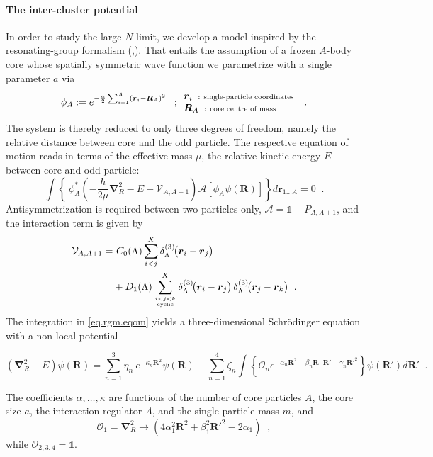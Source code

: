\documentclass[aps,nofootinbib,prl,showpacs,twocolumn,groupedaddress,superscriptaddress]
{revtex4}
\newcommand{\la}{\label}
\newcommand{\be}{\begin{equation}}
\newcommand{\ee}{\end{equation}}
\newcommand{\ve}[1]{\ensuremath{\boldsymbol{#1}}}
\newcommand{\ddrei}[1]{\delta_{\tiny \Lambda}^{(3)}\!\big(#1\big)}
\begin{document}
\paragraph{The inter-cluster potential}
In order to study the large-$N$ limit, we develop a model inspired by the resonating-group formalism
(\cite{Wheeler:1937zz},\cite{Wildermuth1977s}).
That entails the assumption of a frozen $A$-body core whose spatially symmetric wave function we
parametrize with a single parameter $a$ via
\be\label{eq.rgm.corewfkt}
\phi_A:=e^{-\frac{a}{2}\sum_{i=1}^A\left(\ve{r}_i-\ve{R}_A\right)^2}\;\;\;;
\begin{array}{l}
     \ve{r}_i\;\;\text{\scriptsize : single-particle coordinates}  \\
     \ve{R}_A\;\;\text{\scriptsize : core centre of mass}
\end{array}\;\;.
\ee
The system is thereby reduced to only three degrees of freedom, namely the relative distance
between core and the odd particle. The respective equation of motion reads in terms of the effective
mass $\mu$, the relative kinetic energy $E$ between core and odd particle:
\be\label{eq.rgm.eqom}
\int\left\lbrace~\phi^*_A\left(-\frac{\hbar}{2\mu}\ve{\nabla}_R^2-E+\mathcal{V}_{A,A+1}\right)
\mathcal{A}\left[\phi_A\psi(\ve{R})\right]\right\rbrace d\ve{r}_{1\ldots A}=0\;\;.
\ee
Antisymmetrization is required between two particles only, $\mathcal{A}=\mathbb{1}-P_{A,A+1}$, and the
interaction term is given by
\begin{align}
\mathcal{V}_{A,A+1}=&~C_0(\Lambda)\sum_{i<j}^X\ddrei{\ve{r}_i-\ve{r}_j}\\
&+D_1(\Lambda)\sum^X_{i<j<k\atop\text{\tiny cyclic}}\ddrei{\ve{r}_i-\ve{r}_j}\,
\ddrei{\ve{r}_j-\ve{r}_k}\;\;.\nonumber
\end{align}
The integration in \eqref{eq.rgm.eqom} yields a three-dimensional Schr\"odinger equation with a
non-local potential
\begin{widetext}
\be\label{eq.rgm.sglnonloc}
\left(\ve{\nabla}_R^2-E\right)\psi(\ve{R})=\sum_{n=1}^3\eta_n~e^{-\kappa_n\ve{R}^2}\psi(\ve{R})+
\sum_{n=1}^4\zeta_n\int\left\lbrace\mathcal{O}_ne^{-\alpha_n\ve{R}^2-\beta_n\ve{R}\cdot\ve{R}'
-\gamma_n\ve{R}'^2}\right\rbrace\psi(\ve{R}') d\ve{R}'\;\;.
\ee
\end{widetext}
The coefficients $\alpha,\ldots,\kappa$ are functions of the number of core particles $A$,
the core size $a$, the interaction regulator $\Lambda$, and the single-particle mass $m$,
and 
\be\la{eq.exop}
\mathcal{O}_1=\ve{\nabla}_R^2\to\left(4\alpha_1^2\ve{R}^2+\beta_1^2\ve{R}'^2-2\alpha_1\right)\;\;,
\ee
while $\mathcal{O}_{2,3,4}=\mathbb{1}$.
\end{document}
